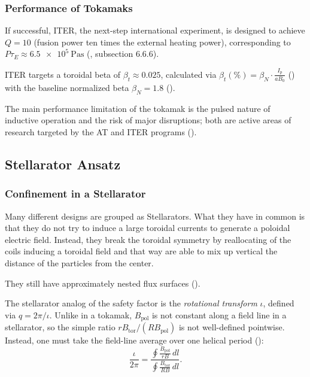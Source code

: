 \subsubsection{Performance of Tokamaks}

If successful, ITER, the next-step international experiment, is designed to achieve $Q=10$ (fusion power ten times
the external heating power), corresponding to $P\tau_E \approx \SI{6.5e5}{\pascal\second}$
(\cite{Freidberg2014}, subsection 6.6.6).


ITER targets a toroidal beta of $\beta_t \approx 0.025$, calculated via 
$\beta_t(\%) = \beta_N \cdot \frac{I_p}{aB_0}$ (\cite{Freidberg2014})
with the baseline normalized beta $\beta_N = 1.8$ (\cite{sips2018}).


The main performance limitation of the tokamak is the pulsed nature of inductive
operation and the risk of major disruptions; both are active areas of research
targeted by the AT and ITER programs (\cite{Freidberg2014}).




\subsection{Stellarator Ansatz}
\subsubsection{Confinement in a Stellarator}
Many different designs are grouped as Stellarators. What they have in common is that
they do not try to induce a large toroidal currents to generate a poloidal electric field.
Instead, they break the toroidal symmetry by reallocating of the coils inducing a toroidal field
and that way are able to mix up vertical the distance of the particles from the center.

They still have approximately nested flux surfaces (\cite{Freidberg2014}).

The stellarator analog of the safety factor is the \emph{rotational
transform} $\iota$, defined via $q = 2\pi/\iota$.
Unlike in a tokamak, $B_\text{pol}$ is not constant along a field line
in a stellarator, so the simple ratio $rB_\text{tor}/(RB_\text{pol})$
is not well-defined pointwise. Instead, one must take the
field-line average over one helical period (\cite{Freidberg2014}):
\begin{equation}
  \frac{\iota}{2\pi}
  = \frac{\displaystyle\oint \frac{B_\text{pol}}{rB}\,dl}
         {\displaystyle\oint \frac{B_\text{tor}}{RB}\,dl}.
  \label{eq:iota_def}
\end{equation}

